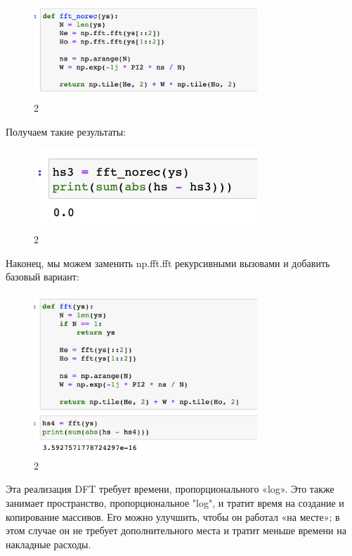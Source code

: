 \documentclass[10pt,a4paper,oneside]{article}
\begin{document}
\begin{figure}[H]
        \centering
        \includegraphics[width=0.75\textwidth]{pics/4.png}
        \caption{2}
        \label{fig:first}
\end{figure}

Получаем такие результаты:

\begin{figure}[H]
        \centering
        \includegraphics[width=0.75\textwidth]{pics/5.png}
        \caption{2}
        \label{fig:first}
\end{figure}

Наконец, мы можем заменить np.fft.fft рекурсивными вызовами и добавить базовый вариант:

\begin{figure}[H]
        \centering
        \includegraphics[width=0.75\textwidth]{pics/6.png}
        \caption{2}
        \label{fig:first}
\end{figure}

Эта реализация DFT требует времени, пропорционального «log». Это также занимает пространство, пропорциональное "log", и тратит время на создание и копирование массивов. Его можно улучшить, чтобы он работал «на месте»; в этом случае он не требует дополнительного места и тратит меньше времени на накладные расходы.
\end{document}
